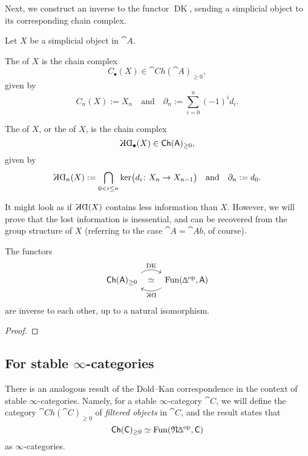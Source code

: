 Next, we construct an inverse to the functor $\operatorname{DK}$,
sending a simplicial object to its corresponding chain complex.

\begin{definition}
    Let $X$ be a simplicial object in $\cat{A}$.
    
    \begin{itms}
        \item
        The  of $X$ is the chain complex 
        \[C_\bullet(X)\in\cat{Ch}(\cat{A})_{\geq0},\]
        given by 
        \[C_n(X):=X_n\quad\text{and}\quad\partial_n:=\sum_{i=0}^n(-1)^id_i.\]

        \item 
        The  of $X$, or the
         of $X$, is the chain complex 
        \[\KD_\bullet(X)\in\cat{Ch}(\cat{A})_{\geq0},\]
        given by 
        \[\KD_n(X):=\bigcap_{0<i\leq n}\ker\bigl(d_i\:X_n\to X_{n-1}\bigr)
        \quad\text{and}\quad\partial_n:=d_0.\]
    \end{itms}
\end{definition}

It might look as if $\KD(X)$ contains less information than $X$.
However, we will prove that the lost information is inessential,
and can be recovered from the group structure of $X$
(referring to the case $\cat{A}=\cat{Ab}$, of course).

\begin{theorem}
    The functors
    \[\begin{tikzcd}
        \cat{Ch}(\cat{A})_{\geq0}
        \ar[r,bend left,start anchor=north east,end anchor=north west,"\operatorname{DK}"] 
        \ar[r,phantom,"\simeq"] &
        \operatorname{Fun}(\bfDelta\op,\cat{A})
        \ar[l,bend left,start anchor=south west,end anchor=south east,"\KD"]
    \end{tikzcd}\]
    are inverse to each other,
    up to a natural isomorphism.
\end{theorem}

\begin{proof}
    \nyw
\end{proof}

\subsection{For stable \texorpdfstring{$\infty$}{∞}-categories}

There is an analogous result of the Dold--Kan correspondence
in the context of stable $\infty$-categories.
Namely, for a stable $\infty$-category $\cat{C}$,
we will define the category $\cat{Ch}(\cat{C})_{\geq0}$ of \emph{filtered objects}
in $\cat{C}$, and the result states that
\[ \cat{Ch}(\cat{C})_{\geq0}\simeq\operatorname{Fun}(\mathfrak N\bfDelta\op,\cat{C}) \]
as $\infty$-categories.

